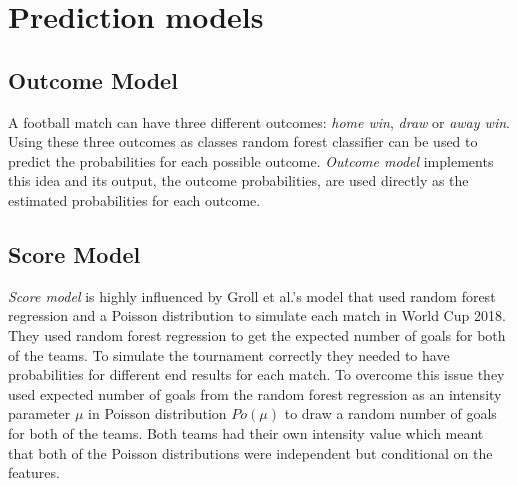 \section{Prediction models}
\subsection{Outcome Model}
A football match can have three different outcomes: \textit{home win}, \textit{draw} or \textit{away win}. Using these three outcomes as classes random forest classifier can be used to predict the probabilities for each possible outcome. \textit{Outcome model} implements this idea and its output, the outcome probabilities, are used directly as the estimated probabilities for each outcome.
\subsection{Score Model}
\textit{Score model} is highly influenced by Groll et al.'s \cite{groll2018prediction} model that used random forest regression and a Poisson distribution to simulate each match in World Cup 2018. They used random forest regression to get the expected number of goals for both of the teams. To simulate the tournament correctly they needed to have probabilities for different end results for each match. To overcome this issue they used expected number of goals from the random forest regression as an intensity parameter $\mu$ in Poisson distribution $Po(\mu)$ to draw a random number of goals for both of the teams. Both teams had their own intensity value which meant that both of the Poisson distributions were independent but conditional on the features.

